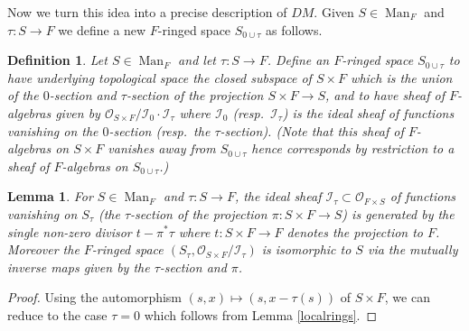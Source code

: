 \documentclass[12pt]{article}
\newtheorem{lemma}[theorem]{Lemma}
\newtheorem{definition}[theorem]{Definition}
\begin{document}
Now we turn this idea into a precise description of $DM$.  Given $S\in\operatorname{Man}_F$ and $\tau:S\rightarrow F$ we define a new $F$-ringed space $S_{0\cup \tau}$ as follows.

\begin{definition}
Let $S\in\operatorname{Man}_F$ and let $\tau:S\rightarrow F$.  Define an $F$-ringed space $S_{0\cup \tau}$ to have underlying topological space the closed subspace of $S\times F$ which is the union of the $0$-section and $\tau$-section of the projection $S\times F\rightarrow S$, and to have sheaf of $F$-algebras given by $\mathcal{O}_{S\times F}/\mathcal{I}_0\cdot\mathcal{I}_\tau$ where $\mathcal{I}_0$ (resp.\ $\mathcal{I}_\tau$) is the ideal sheaf of functions vanishing on the $0$-section (resp.\ the $\tau$-section).  (Note that this sheaf of $F$-algebras on $S\times F$ vanishes away from $S_{0\cup \tau}$ hence corresponds by restriction to a sheaf of $F$-algebras on $S_{0\cup \tau}$.)
\end{definition}

\begin{lemma}\label{cartiersection}
For $S\in\operatorname{Man}_F$ and $\tau:S\rightarrow F$, the ideal sheaf $\mathcal{I}_\tau\subset\mathcal{O}_{F\times S}$ of functions vanishing on $S_\tau$ (the $\tau$-section of the projection $\pi:S\times F\rightarrow S$) is generated by the single non-zero divisor $t-\pi^\ast\tau$ where $t:S\times F\rightarrow F$ denotes the projection to $F$.  Moreover the $F$-ringed space $(S_\tau,\mathcal{O}_{S\times F}/\mathcal{I}_\tau)$ is isomorphic to $S$ via the mutually inverse maps given by the $\tau$-section and $\pi$.
\end{lemma}
\begin{proof}
Using the automorphism $(s,x)\mapsto (s,x-\tau(s))$ of $S\times F$, we can reduce to the case $\tau=0$ which follows from Lemma \ref{localrings}.
\end{proof}
\end{document}
